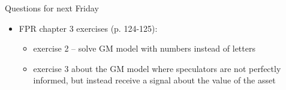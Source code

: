 \documentclass[english,10pt
,aspectratio=169
]{beamer}
\begin{document}
\begin{frame}{Questions for next Friday}
	\begin{itemize}
		\item FPR chapter 3 exercises (p. 124-125):
		\begin{itemize}
			\item exercise 2 -- solve GM model with numbers instead of letters
			\item exercise 3 about the GM model where speculators are not perfectly informed, but instead receive a signal about the value of the asset
		\end{itemize}
	\end{itemize}
\end{frame}
\end{document}
